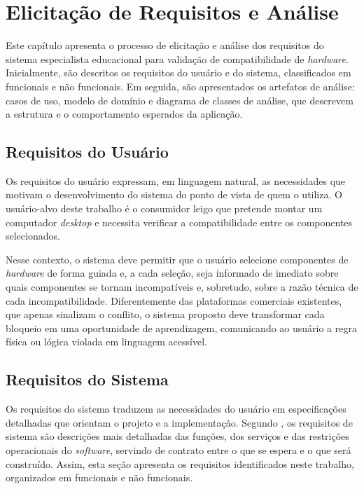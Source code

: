 \chapter{Elicitação de Requisitos e Análise}
\label{cap:05}

Este capítulo apresenta o processo de elicitação e análise dos requisitos do
sistema especialista educacional para validação de compatibilidade de
\textit{hardware}. Inicialmente, são descritos os requisitos do usuário e do
sistema, classificados em funcionais e não funcionais. Em seguida, são
apresentados os artefatos de análise: casos de uso, modelo de domínio e
diagrama de classes de análise, que descrevem a estrutura e o comportamento
esperados da aplicação.

\section{Requisitos do Usuário}

Os requisitos do usuário expressam, em linguagem natural, as necessidades que
motivam o desenvolvimento do sistema do ponto de vista de quem o utiliza. O
usuário-alvo deste trabalho é o consumidor leigo que pretende montar um
computador \textit{desktop} e necessita verificar a compatibilidade entre os
componentes selecionados.

Nesse contexto, o sistema deve permitir que o usuário selecione componentes de
\textit{hardware} de forma guiada e, a cada seleção, seja informado de imediato
sobre quais componentes se tornam incompatíveis e, sobretudo, sobre a razão
técnica de cada incompatibilidade. Diferentemente das plataformas comerciais
existentes, que apenas sinalizam o conflito, o sistema proposto deve transformar
cada bloqueio em uma oportunidade de aprendizagem, comunicando ao usuário a
regra física ou lógica violada em linguagem acessível.

\section{Requisitos do Sistema}

Os requisitos do sistema traduzem as necessidades do usuário em especificações
detalhadas que orientam o projeto e a implementação. Segundo
\textcite{sommerville2011}, os requisitos de sistema são descrições mais
detalhadas das funções, dos serviços e das restrições operacionais do
\textit{software}, servindo de contrato entre o que se espera e o que será
construído. Assim, esta seção apresenta os requisitos identificados neste
trabalho, organizados em funcionais e não funcionais.

